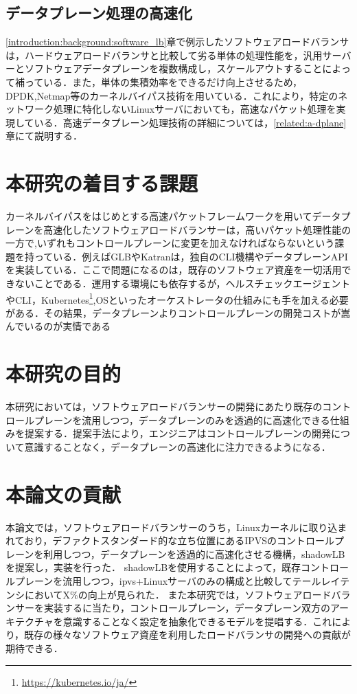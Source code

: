 \subsection{データプレーン処理の高速化}
\ref{introduction:background:software_lb}章で例示したソフトウェアロードバランサは，ハードウェアロードバランサと比較して劣る単体の処理性能を，汎用サーバーとソフトウェアデータプレーンを複数構成し，スケールアウトすることによって補っている．また，単体の集積効率をできるだけ向上させるため，DPDK\cite{DPDK},Netmap\cite{netmap}等のカーネルバイパス技術を用いている．これにより，特定のネットワーク処理に特化しないLinuxサーバにおいても，高速なパケット処理を実現している．高速データプレーン処理技術の詳細については，\ref{related:a-dplane}章にて説明する．


\section{本研究の着目する課題}
カーネルバイパスをはじめとする高速パケットフレームワークを用いてデータプレーンを高速化したソフトウェアロードバランサーは，高いパケット処理性能の一方で,いずれもコントロールプレーンに変更を加えなければならないという課題を持っている．例えばGLBやKatranは，独自のCLI機構やデータプレーンAPIを実装している\cite{GLB-director}．ここで問題になるのは，既存のソフトウェア資産を一切活用できないことである．運用する環境にも依存するが，ヘルスチェックエージェントやCLI，Kubernetes\footnote{\url{https://kubernetes.io/ja/}},OSといったオーケストレータの仕組みにも手を加える必要がある．その結果，データプレーンよりコントロールプレーンの開発コストが嵩んでいるのが実情である\cite{slankdev_slides}

\section{本研究の目的}
本研究においては，ソフトウェアロードバランサーの開発にあたり既存のコントロールプレーンを流用しつつ，データプレーンのみを透過的に高速化できる仕組みを提案する．提案手法により，エンジニアはコントロールプレーンの開発について意識することなく，データプレーンの高速化に注力できるようになる．

\section{本論文の貢献}
本論文では，ソフトウェアロードバランサーのうち，Linuxカーネルに取り込まれており，デファクトスタンダード的な立ち位置にあるIPVS\cite{IPVS}のコントロールプレーンを利用しつつ，データプレーンを透過的に高速化させる機構，shadowLBを提案し，実装を行った． shadowLBを使用することによって，既存コントロールプレーンを流用しつつ，ipvs+Linuxサーバのみの構成と比較してテールレイテンシにおいてX\%の向上が見られた．
また本研究では，ソフトウェアロードバランサーを実装するに当たり，コントロールプレーン，データプレーン双方のアーキテクチャを意識することなく設定を抽象化できるモデルを提唱する．これにより，既存の様々なソフトウェア資産を利用したロードバランサの開発への貢献が期待できる．




